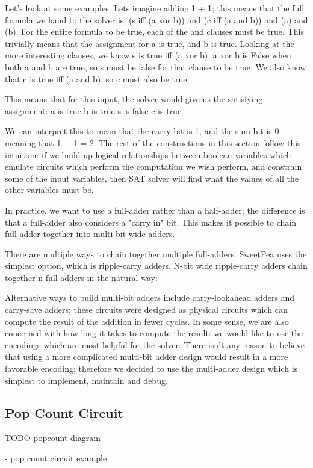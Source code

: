 Let's look at some examples. Lets imagine adding 1 + 1; this means that the full formula we hand to the solver is:
(s iff (a xor b)) and (c iff (a and b)) and (a) and (b).
For the entire formula to be true, each of the and clauses must be true. This trivially means that the assignment for a is true, and b is true. Looking at the more interesting clauses, we know s is true iff (a xor b). a xor b is False when both a and b are true, so s must be false for that clause to be true. We also know that c is true iff (a and b), so c must also be true.

This means that for this input, the solver would give us the satisfying assignment:
a is true
b is true
s is false
c is true

We can interpret this to mean that the carry bit is 1, and the sum bit is 0: meaning that 1 + 1 = 2. The rest of the constructions in this section follow this intuition: if we build up logical relationships between boolean variables which emulate circuits which perform the computation we wish perform, and constrain some of the input variables, then SAT solver will find what the values of all the other variables must be.

In practice, we want to use a full-adder rather than a half-adder; the difference is that a full-adder also considers a "carry in" bit. This makes it possible to chain full-adder together into multi-bit wide adders.

There are multiple ways to chain together multiple full-adders. SweetPea uses the simplest option, which is ripple-carry adders. N-bit wide ripple-carry adders chain together n full-adders in the natural way:

Alternative ways to build multi-bit adders include carry-lookahead adders and carry-save adders; these circuits were designed as physical circuits which can compute the result of the addition in fewer cycles. In some sense, we are also concerned with how long it takes to compute the result: we would like to use the encodings which are most helpful for the solver. There isn't any reason to believe that using a more complicated multi-bit adder design would result in a more favorable encoding; therefore we decided to use the multi-adder design which is simplest to implement, maintain and debug.

\subsection{Pop Count Circuit}

TODO popcount diagram


- pop count circuit example
